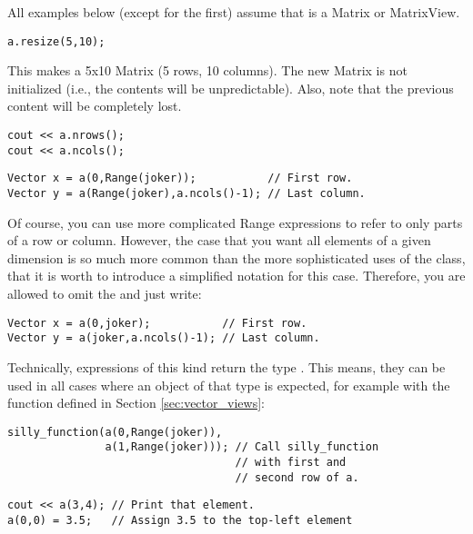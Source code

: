 
All examples below (except for the first) assume that  is a
Matrix or MatrixView.

\begin{verbatim}
a.resize(5,10);
\end{verbatim}
This makes  a 5x10 Matrix (5 rows, 10 columns). The new Matrix
is not initialized (i.e., the contents will be unpredictable). Also,
note that the previous content will be completely lost.

\begin{verbatim}
cout << a.nrows();
cout << a.ncols();
\end{verbatim}

\begin{verbatim}
Vector x = a(0,Range(joker));           // First row.
Vector y = a(Range(joker),a.ncols()-1); // Last column.
\end{verbatim}
Of course, you can use more complicated Range expressions to refer to
only parts of a row or column. However, the case that you want all
elements of a given dimension is so
much more common than the more sophisticated uses of the
 class, that it is worth to introduce a simplified
notation for this case. Therefore, you are allowed to
omit the  and just write:
\begin{verbatim}
Vector x = a(0,joker);           // First row.
Vector y = a(joker,a.ncols()-1); // Last column.
\end{verbatim}

Technically, expressions of this kind return the type
. This means, they can be used in all cases
where an object of that type is expected, for example with the
function defined in Section \ref{sec:vector_views}:

\begin{verbatim}
silly_function(a(0,Range(joker)),
               a(1,Range(joker))); // Call silly_function
                                   // with first and
                                   // second row of a.
\end{verbatim}



\begin{verbatim}
cout << a(3,4); // Print that element.
a(0,0) = 3.5;   // Assign 3.5 to the top-left element
\end{verbatim}

